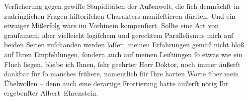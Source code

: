                     Verſicherung gegen gewiſſe Stupiditäten der Außenwelt, die ſich demnächſt in
                    zudringlichen Fragen hiſtoriſchen Charakters manifeſtieren dürften.\pend
           \pstart
           {\pb}Und ein etwaiger Mißerfolg wäre im Vorhinein
                    kompenſiert.\pend
           \pstart
           Sollte eine Art von grauſamem, aber vielleicht logiſchem und gerechtem
                    Parallelismus mich auf beiden Seiten zuſchanden werden laſſen, meinen
                    Erfahrungen gemäß nicht bloß auf Ihren Empfehlungen, ſondern auch auf meinen
                    Leiſtungen ſo etwas wie ein Fluch liegen, bleibe ich Ihnen, ſehr geehrter Herr
                    Doktor, noch immer äußerſt dankbar für ſo manches frühere, namentlich für Ihre
                    harten Worte über mein Übelwollen – denn auch eine derartige Frottierung hatte
                    äußerſt nötig Ihr ergebenſter\pend
           \pstart \spacefill\mbox{Albert Ehrenstein.}\pend{}\endnumbering{}  
      